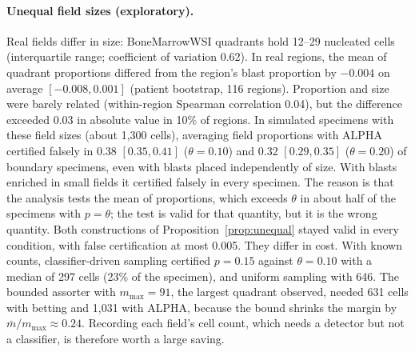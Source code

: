 \documentclass[11pt]{article}
\theoremstyle{remark}
\theoremstyle{definition}
\begin{document}
\paragraph{Unequal field sizes (exploratory).} Real fields differ in size: BoneMarrowWSI quadrants hold 12--29 nucleated cells (interquartile range; coefficient of variation 0.62). In real regions, the mean of quadrant proportions differed from the region's blast proportion by $-0.004$ on average $[-0.008,0.001]$ (patient bootstrap, 116 regions). Proportion and size were barely related (within-region Spearman correlation 0.04), but the difference exceeded 0.03 in absolute value in 10\% of regions. In simulated specimens with these field sizes (about 1,300 cells), averaging field proportions with ALPHA certified falsely in 0.38 $[0.35,0.41]$ ($\theta=0.10$) and 0.32 $[0.29,0.35]$ ($\theta=0.20$) of boundary specimens, even with blasts placed independently of size. With blasts enriched in small fields it certified falsely in every specimen. The reason is that the analysis tests the mean of proportions, which exceeds $\theta$ in about half of the specimens with $p=\theta$; the test is valid for that quantity, but it is the wrong quantity. Both constructions of Proposition~\ref{prop:unequal} stayed valid in every condition, with false certification at most 0.005. They differ in cost. With known counts, classifier-driven sampling certified $p=0.15$ against $\theta=0.10$ with a median of 297 cells (23\% of the specimen), and uniform sampling with 646. The bounded assorter with $m_{\max}=91$, the largest quadrant observed, needed 631 cells with betting and 1,031 with ALPHA, because the bound shrinks the margin by $\bar m/m_{\max}\approx0.24$. Recording each field's cell count, which needs a detector but not a classifier, is therefore worth a large saving.
\end{document}
